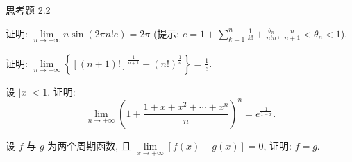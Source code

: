 \begin{exblock}{思考题 2.2}
\item 证明: $\lim\limits_{n \to +\infty} n \sin(2\pi n! e) = 2\pi$ (提示: $e = 1 + \sum\limits_{k=1}^{n} \frac{1}{k!} + \frac{\theta_n}{n! n},\ \frac{n}{n+1} < \theta_n < 1$).
\item 证明: $\lim\limits_{n\to+\infty}\left\{[(n+1)!]^{\frac{1}{n+1}}-(n!)^{\frac{1}{n}}\right\}=\frac{1}{e}$.
\item 设 $|x| < 1$. 证明:
\[
\lim_{n\to+\infty}\left(1+\frac{1+x+x^2+\cdots+x^n}{n}\right)^n=e^{\frac{1}{1-x}}.
\]
\item 设 $f$ 与 $g$ 为两个周期函数, 且 $\lim\limits_{x \to +\infty} [f(x) - g(x)] = 0$, 证明: $f = g$.
\end{exblock}
